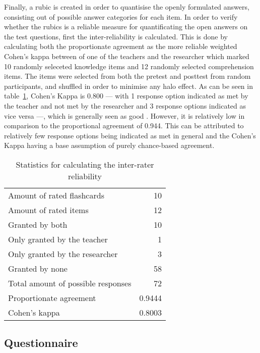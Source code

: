 Finally, a rubic is created in order to quantisise the openly formulated answers, consisting out of possible answer categories for each item. In order to verify whether the rubics is a reliable measure for quantificating the open answers on the test questions, first the inter-reliability is calculated. This is done by calculating both the proportionate agreement as the more reliable weighted Cohen's kappa \cite{kappa} between of one of the teachers and the researcher which marked 10 randomly seleceted knowledge items and 12 randomly selected comprehension items. The items were selected from both the pretest and posttest from random participants, and shuffled in order to minimise any halo effect. As can be seen in table~\ref{tab:irr}, Cohen's Kappa is 0.800 --- with 1 response option indicated as met by the teacher and not met by the researcher and 3 response options indicated as vice versa ---, which is generally seen as good \cite{baarda}. However, it is relatively low in comparison to the proportional agreement of 0.944. This can be attributed to relatively few response options being indicated as met in general and the Cohen's Kappa having a base assumption of purely chance-based agreement.

\begin{table}
    \centering
    \begin{tabular}{lr}
        Amount of rated flashcards         & 10 \\
        Amount of rated items              & 12 \\
        Granted by both                    & 10 \\
        Only granted by the teacher        &  1 \\
        Only granted by the researcher     &  3 \\
        Granted by none                    & 58 \\
        Total amount of possible responses & 72 \\
        Proportionate agreement            & 0.9444 \\
        Cohen's kappa                      & 0.8003 \\
    \end{tabular}
    \caption{Statistics for calculating the inter-rater reliability}
    \label{tab:irr}
\end{table}

\subsection{Questionnaire}

